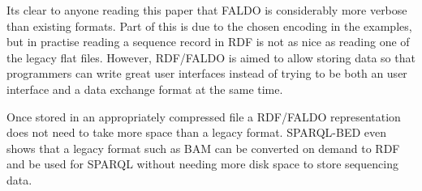 Its clear to anyone reading this paper that FALDO is considerably more 
verbose than existing formats. Part of this is due to the chosen encoding
in the examples, but in practise reading a sequence record in RDF is not as
nice as reading one of the legacy flat files. However, RDF/FALDO is aimed to allow
storing data so that programmers can write great user interfaces instead of trying
to be both an user interface and a data exchange format at the same time.

Once stored in an appropriately compressed file a RDF/FALDO representation does not
need to take more space than a legacy format. SPARQL-BED even shows that a legacy
format such as BAM can be converted on demand to RDF and be used for SPARQL without 
needing more disk space to store sequencing data.






